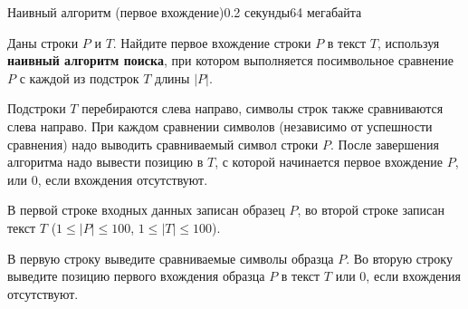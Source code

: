 \begin{problem}{Наивный алгоритм (первое вхождение)}{}{}{0.2 секунды}{64 мегабайта}

Даны строки $P$ и $T$. Найдите первое вхождение строки $P$ в текст $T$, используя {\bf наивный алгоритм поиска}, 
при котором выполняется посимвольное сравнение $P$ с каждой из подстрок $T$ длины $|P|$. 

Подстроки $T$ перебираются слева направо, символы строк также сравниваются слева направо. 
При каждом сравнении символов (независимо от успешности сравнения) надо выводить сравниваемый символ строки $P$. 
После завершения алгоритма надо вывести позицию в $T$, с которой начинается первое вхождение $P$, или $0$, если вхождения отсутствуют. 

\InputFile
В первой строке входных данных записан образец $P$, 
во второй строке записан текст $T$ ($1 \le |P| \le 100$, $1 \le |T| \le 100$).


\OutputFile
В первую строку выведите сравниваемые символы образца $P$.
Во вторую строку выведите позицию первого вхождения образца $P$ в текст $T$ или $0$, если вхождения отсутствуют.


\Examples

\begin{example}
%
\end{example}

\end{problem}

